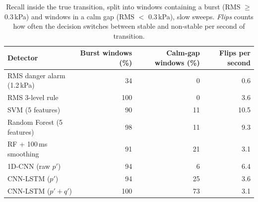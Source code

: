 \begin{table}[H]\centering\small
\caption{Recall inside the true transition, split into windows containing a burst (RMS $\geq$ 0.3\,kPa) and windows in a calm gap (RMS $<$ 0.3\,kPa), slow sweeps. \textit{Flips} counts how often the decision switches between stable and non-stable per second of transition.}\label{tab:gap}
\begin{tabular}{lrrr}\toprule
Detector & Burst windows (\%) & Calm-gap windows (\%) & Flips per second \\\midrule
RMS danger alarm (1.2\,kPa) & 34 & 0 & 0.6 \\
RMS 3-level rule & 100 & 0 & 3.6 \\
SVM (5 features) & 90 & 11 & 10.5 \\
Random Forest (5 features) & 98 & 11 & 9.3 \\
RF + 100\,ms smoothing & 91 & 21 & 3.1 \\
1D-CNN (raw $p'$) & 94 & 6 & 6.4 \\
CNN-LSTM ($p'$) & 94 & 25 & 3.6 \\
CNN-LSTM ($p'+q'$) & 100 & 73 & 3.1 \\
\bottomrule\end{tabular}
\end{table}